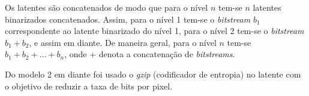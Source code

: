 Os latentes são concatenados de modo que para o nível $n$ tem-se $n$ latentes binarizados concatenados. Assim, para o nível 1 tem-se o \textit{bitstream} $b_1$ correspondente ao latente binarizado do nível 1, para o nível 2 tem-se o \textit{bitstream} $b_1 + b_2$, e assim em diante. De maneira geral, para o nível $n$ tem-se $b_1 + b_2 + \dots + b_n$, onde $+$ denota a concatenação de \textit{bitstreams}. 

Do modelo 2 em diante foi usado o \textit{gzip} (codificador de entropia) no latente com o objetivo de reduzir a taxa de bits por pixel.

